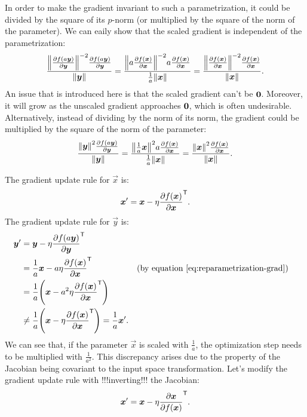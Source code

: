 \documentclass{article}
\begin{document}
In order to make the gradient invariant to such a parametrization, it could be divided by the square of its $p$-norm (or multiplied by the square of the norm of the parameter).
We can eaily show that the scaled gradient is independent of the parametrization:
\begin{align}
    \frac{\enVert{\pd{f\del{a\vec y}}{\vec y}}^{-2}\pd{f\del{a\vec y}}{\vec y}}{\enVert{\vec y}}
    = \frac{\enVert{a\pd{f\del{\vec x}}{\vec x}}^{-2}a\pd{f\del{\vec x}}{\vec x}}{\frac{1}{a}\enVert{\vec x}}
    = \frac{\enVert{\pd{f\del{\vec x}}{\vec x}}^{-2}\pd{f\del{\vec x}}{\vec x}}{\enVert{\vec x}} \text{.}
\end{align}
An issue that is introduced here is that the scaled gradient can't be $\mathbf{0}$. Moreover, it will grow as the unscaled gradient approaches $\mathbf{0}$, which is often undesirable. Alternatively, instead of dividing by the norm of its norm, the gradient could be multiplied by the square of the norm of the parameter:
\begin{align}
    \frac{\enVert{\vec y}^{2}\pd{f\del{a\vec y}}{\vec y}}{\enVert{\vec y}}
    = \frac{\enVert{\frac{1}{a}\vec x}^{2}a\pd{f\del{\vec x}}{\vec x}}{\frac{1}{a}\enVert{\vec x}}
    = \frac{\enVert{\vec x}^{2}\pd{f\del{\vec x}}{\vec x}}{\enVert{\vec x}} \text{.} \\
\end{align}

The gradient update rule for $\vec x$ is:
\begin{align}
    \vec x' = \vec x -\eta\pd{f(\vec x)}{\vec x}^\tp \text{.}
\end{align}
The gradient update rule for $\vec y$ is:
\begin{align}
    \vec y' 
    &= \vec y -\eta\pd{f(a\vec y)}{\vec y} ^\tp \\
    &= \frac{1}{a}\vec x -a\eta\pd{f(\vec x)}{\vec x}^\tp &&\text{(by equation \eqref{eq:reparametrization-grad})} \\
    &= \frac{1}{a}\del{\vec x -a^2\eta\pd{f(\vec x)}{\vec x}^\tp}\\
    &\neq \frac{1}{a}\del{\vec x -\eta\pd{f(\vec x)}{\vec x}^\tp} = \frac{1}{a}\vec x' \text{.}
\end{align}
We can see that, if the parameter $\vec x$ is scaled with $\frac{1}{a}$, the optimization step needs to be
multiplied with $\frac{1}{a^2}$. This discrepancy arises due to the property of the Jacobian being covariant to the input space transformation. Let's modify the gradient update rule with !!!inverting!!! the Jacobian:
\begin{align}
    \vec x' = \vec x -\eta\pd{\vec x}{f(\vec x)}^\tp \text{.}
\end{align}
\end{document}
